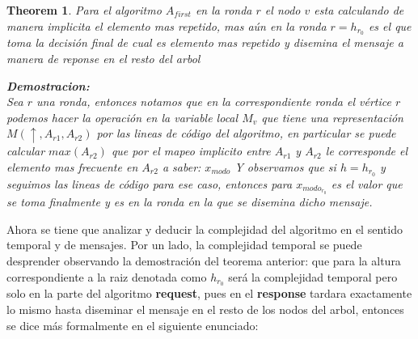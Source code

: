 \documentclass[10pt]{report}
\newtheorem{theorem}{Theorem}
\begin{document}
\begin{theorem}
    Para el algoritmo $A_{first}$ en la ronda $r$ el nodo $v$ esta calculando de manera implicita el elemento mas repetido,
    mas aún en la ronda $r = h_{r_{0}}$ es el que toma la decisión final de cual es elemento mas repetido y disemina
    el mensaje a manera de reponse en el resto del arbol

    \textbf{Demostracion:}\\
    Sea $r$ una ronda, entonces notamos que en la correspondiente ronda el vértice $r$ podemos hacer la operación
    en la variable local $M_{v}$ que tiene una representación $M(\uparrow, A_{r1}, A_{r2})$ por las lineas de código del
    algoritmo, en particular se puede calcular $max(A_{r2})$ que por el mapeo implicito entre $A_{r1}$ y $A_{r2}$ le corresponde
    el elemento mas frecuente en $A_{r2}$ a saber: $x_{modo}$
    Y observamos que si $h= h_{r_{0}}$ y seguimos las lineas de código para ese caso, entonces para $x_{modo_{r_0}}$ es el valor
    que se toma finalmente y es en la ronda en la que se disemina dicho mensaje.

\end{theorem}


    Ahora se tiene que analizar y deducir la complejidad del algoritmo en el sentido temporal y de mensajes.
    Por un lado, la complejidad temporal se puede desprender observando la demostración del teorema anterior: \newline
    que para la altura correspondiente a la raiz denotada como $h_ {r_{0}}$ será la complejidad temporal pero solo en
    la parte del algoritmo \textbf{request}, pues en el \textbf{response} tardara exactamente lo mismo hasta diseminar
    el mensaje en el resto de los nodos del arbol, entonces se dice más formalmente en el siguiente enunciado:
\end{document}
